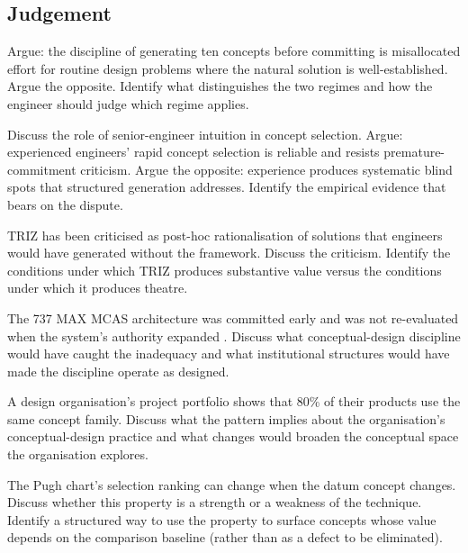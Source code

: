 \subsection*{Judgement}

\begin{exercise}
Argue: the discipline of generating ten concepts before committing is misallocated effort for routine design problems where the natural solution is well-established. Argue the opposite. Identify what distinguishes the two regimes and how the engineer should judge which regime applies.
\end{exercise}

\begin{exercise}
Discuss the role of senior-engineer intuition in concept selection. Argue: experienced engineers' rapid concept selection is reliable and resists premature-commitment criticism. Argue the opposite: experience produces systematic blind spots that structured generation addresses. Identify the empirical evidence that bears on the dispute.
\end{exercise}

\begin{exercise}
TRIZ has been criticised as post-hoc rationalisation of solutions that engineers would have generated without the framework. Discuss the criticism. Identify the conditions under which TRIZ produces substantive value versus the conditions under which it produces theatre.
\end{exercise}

\begin{exercise}
The 737 MAX MCAS architecture was committed early and was not re-evaluated when the system's authority expanded \cite{acc:house-737max-2020}. Discuss what conceptual-design discipline would have caught the inadequacy and what institutional structures would have made the discipline operate as designed.
\end{exercise}

\begin{exercise}
A design organisation's project portfolio shows that 80\% of their products use the same concept family. Discuss what the pattern implies about the organisation's conceptual-design practice and what changes would broaden the conceptual space the organisation explores.
\end{exercise}

\begin{exercise}
The Pugh chart's selection ranking can change when the datum concept changes. Discuss whether this property is a strength or a weakness of the technique. Identify a structured way to use the property to surface concepts whose value depends on the comparison baseline (rather than as a defect to be eliminated).
\end{exercise}

